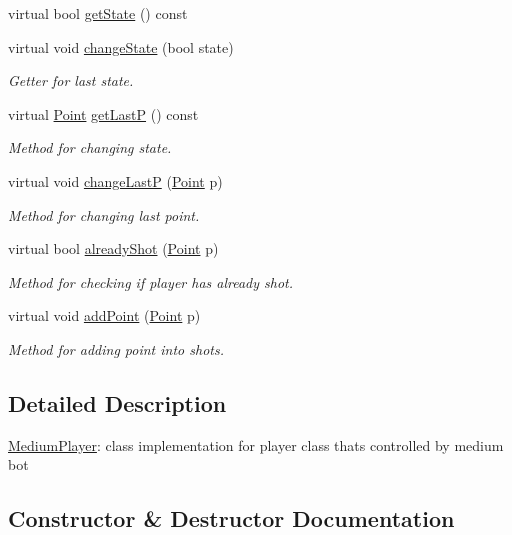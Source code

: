\begin{DoxyCompactItemize}
virtual bool \mbox{\hyperlink{class_medium_player_a90a8cd5feeaa759043af77afe266907c}{get\+State}} () const
\item 
virtual void \mbox{\hyperlink{class_medium_player_ae0f69d678d6567e09baed0350468be61}{change\+State}} (bool state)
\begin{DoxyCompactList}\small\item\em Getter for last state. \end{DoxyCompactList}\item 
virtual \mbox{\hyperlink{class_point}{Point}} \mbox{\hyperlink{class_medium_player_abd585986250a5b713d6a554ea70e3ba6}{get\+LastP}} () const
\begin{DoxyCompactList}\small\item\em Method for changing state. \end{DoxyCompactList}\item 
virtual void \mbox{\hyperlink{class_medium_player_afc952f7dac91d979743154c021d8dee8}{change\+LastP}} (\mbox{\hyperlink{class_point}{Point}} p)
\begin{DoxyCompactList}\small\item\em Method for changing last point. \end{DoxyCompactList}\item 
virtual bool \mbox{\hyperlink{class_medium_player_a0c237af510ff84898759ed2e9a9271ce}{already\+Shot}} (\mbox{\hyperlink{class_point}{Point}} p)
\begin{DoxyCompactList}\small\item\em Method for checking if player has already shot. \end{DoxyCompactList}\item 
virtual void \mbox{\hyperlink{class_medium_player_a4cd5cbf0327e002112c80a52b279358f}{add\+Point}} (\mbox{\hyperlink{class_point}{Point}} p)
\begin{DoxyCompactList}\small\item\em Method for adding point into shots. \end{DoxyCompactList}\end{DoxyCompactItemize}


\subsection{Detailed Description}
\mbox{\hyperlink{class_medium_player}{Medium\+Player}}\+: class implementation for player class that\textquotesingle{}s controlled by medium bot 

\subsection{Constructor \& Destructor Documentation}
\mbox{\label{class_medium_player_ade2cbbd7600c6958afdd214414d62174}} 
